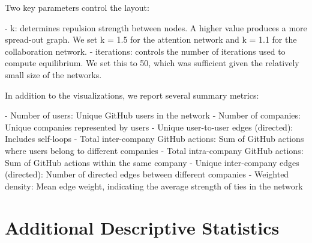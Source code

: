 Two key parameters control the layout:

- k: determines repulsion strength between nodes. A higher value produces a more spread-out graph. We set k = 1.5 for the attention network and k = 1.1 for the collaboration network.
- iterations: controls the number of iterations used to compute equilibrium. We set this to 50, which was sufficient given the relatively small size of the networks.

In addition to the visualizations, we report several summary metrics:

- Number of users: Unique GitHub users in the network
- Number of companies: Unique companies represented by users
- Unique user-to-user edges (directed): Includes self-loops
- Total inter-company GitHub actions: Sum of GitHub actions where users belong to different companies
- Total intra-company GitHub actions: Sum of GitHub actions within the same company
- Unique inter-company edges (directed): Number of directed edges between different companies
- Weighted density: Mean edge weight, indicating the average strength of ties in the network


\section{Additional Descriptive Statistics}
